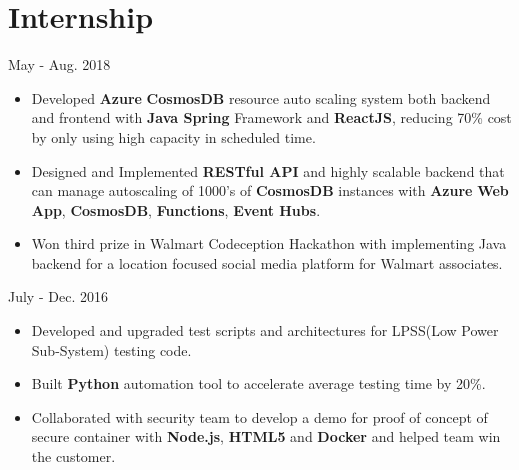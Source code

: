 \documentclass{resume}
\begin{document}
\section{Internship}
 {\hfill   May - Aug. 2018}
\begin{itemize}
\item{Developed \textbf{Azure} \textbf{CosmosDB} resource auto scaling system both backend and frontend with \textbf{Java Spring} Framework and \textbf{ReactJS}, reducing 70\% cost by only using high capacity in scheduled time.}
\item{Designed and Implemented \textbf{RESTful API} and highly scalable backend that can manage autoscaling of 1000's of \textbf{CosmosDB} instances with \textbf{Azure} \textbf{Web App}, \textbf{CosmosDB}, \textbf{Functions}, \textbf{Event Hubs}.}
\item{Won third prize in Walmart Codeception Hackathon with implementing Java backend for a location focused social media platform for Walmart associates.}
\end{itemize}
 {\hfill   July - Dec. 2016}
\begin{itemize}
\item{Developed and upgraded test scripts and architectures for LPSS(Low Power Sub-System) testing code.}
\item{Built \textbf{Python} automation tool to accelerate average testing time by 20\%.}
\item{Collaborated with security team to develop a demo for proof of concept of secure container with \textbf{Node.js}, \textbf{HTML5} and \textbf{Docker} and helped team win the customer.}
\end{itemize}
\end{document}
